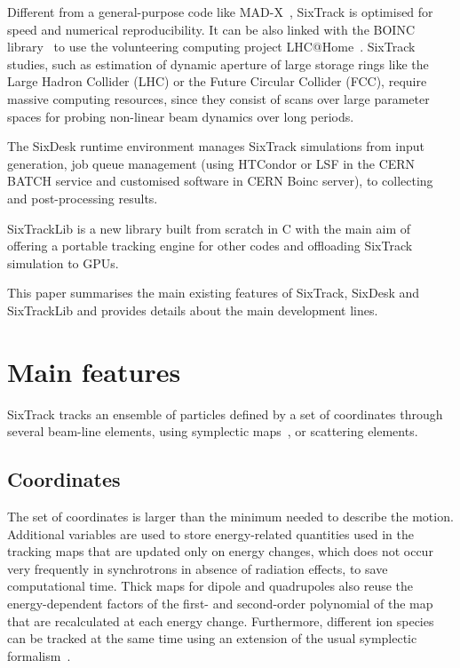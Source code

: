 \documentclass[a4paper,
              ]{jacow}
\begin{document}
Different from a general-purpose code like MAD-X~\cite{madx, madxICAP18}, SixTrack is optimised for speed and numerical reproducibility. It can be also linked with the BOINC library~\cite{BOINC} to use the volunteering computing project LHC@Home~\cite{lhcathome}.
SixTrack studies, such as estimation of dynamic aperture of large storage rings like the Large Hadron Collider (LHC) or the Future Circular Collider (FCC), require massive computing resources, since they consist of scans over large parameter spaces for probing non-linear beam dynamics over long periods.

The SixDesk runtime environment manages SixTrack simulations from input generation, job queue management (using HTCondor or LSF in the CERN BATCH service and customised software in CERN Boinc server), to collecting and post-processing results.  

SixTrackLib is a new library built from scratch in C with the main aim of offering a portable tracking engine for other codes and offloading SixTrack simulation to GPUs.

This paper summarises the main existing features of SixTrack, SixDesk and SixTrackLib and provides details about the main development lines.

\section{Main features}

SixTrack tracks an ensemble of particles defined by a set of coordinates through several beam-line elements, using symplectic maps~\cite{ripken95, heinemann95, barber87}, or scattering elements.

\subsection{Coordinates}
The set of coordinates is larger than the minimum needed to describe the motion. Additional variables are used to store energy-related quantities used in the tracking maps that are updated only on energy changes, which does not occur very frequently in synchrotrons in absence of radiation effects, to save computational time. Thick maps for dipole and quadrupoles also reuse the energy-dependent factors of the first- and second-order polynomial of the map that are recalculated at each energy change. Furthermore, different ion species %
can be tracked at the same time using an extension of the usual symplectic formalism~\cite{ions}.
\end{document}
